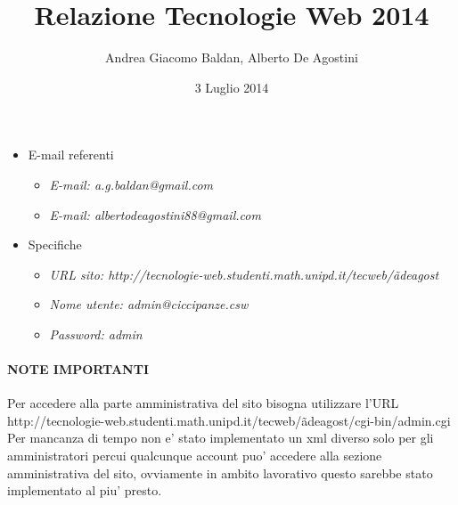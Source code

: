 \documentclass[a4paper, 12pt]{article}
\title{Relazione Tecnologie Web 2014}
\author{Andrea Giacomo Baldan, Alberto De Agostini}
\date{3 Luglio 2014}
\begin{document}
\maketitle

\begin{itemize}
\item E-mail referenti
  \begin{itemize}
  \item \emph{E-mail: a.g.baldan@gmail.com}
  \item \emph{E-mail: albertodeagostini88@gmail.com}
  \end{itemize}
\item Specifiche
  \begin{itemize}
  \item \emph{URL sito: http://tecnologie-web.studenti.math.unipd.it/tecweb/\~adeagost}
  \item \emph{Nome utente: admin@ciccipanze.csw}
  \item \emph{Password: admin}
  \end{itemize}
\end{itemize}

\paragraph{NOTE IMPORTANTI}
Per accedere alla parte amministrativa del sito bisogna utilizzare l'URL\newline
http://tecnologie-web.studenti.math.unipd.it/tecweb/\~adeagost/cgi-bin/admin.cgi\newline
Per mancanza di tempo non e' stato implementato un xml diverso solo per gli amministratori percui qualcunque account puo' accedere alla sezione amministrativa del sito, ovviamente in ambito lavorativo questo sarebbe stato implementato al piu' presto.








\end{document}
